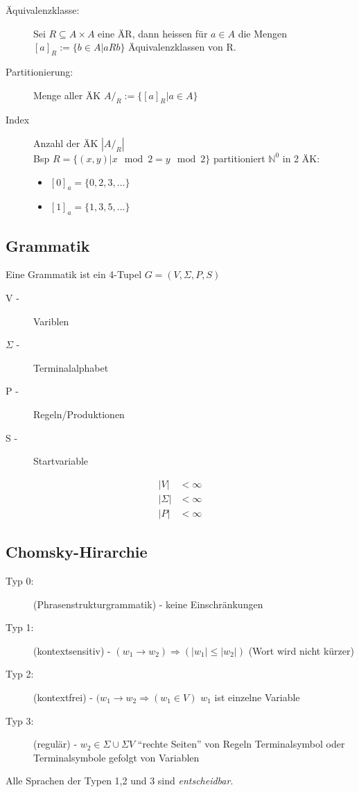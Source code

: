 \documentclass{scrartcl}
\begin{document}
\begin{description}
    \item[Äquivalenzklasse:] Sei $R \subseteq A\times A$ eine ÄR, dann heissen für $a\in A$ die Mengen $[a]_R:=\{b\in A | aRb\}$ Äquivalenzklassen von R.
    \item[Partitionierung:] Menge aller ÄK $A/_R:=\{[a]_R | a\in A\}$
    \item[Index] Anzahl der ÄK $|A/_R|$ \\
    Bsp $R=\{(x,y) | x \mod 2 = y \mod 2\}$ partitioniert $\mathds{N}^0$ in 2 ÄK:
    \begin{itemize}
        \item $[0]_a = \{0,2,3,\dots\}$
        \item $[1]_a = \{1,3,5,\dots\}$
    \end{itemize}
\end{description}

\subsection*{Grammatik}
Eine Grammatik ist ein 4-Tupel $G=(V,\Sigma,P,S)$ \\[.5cm]
\begin{minipage}[t]{4.5cm}
\begin{description}
\item[V -] Variblen
\item[$\Sigma$ -] Terminalalphabet
\item[P -] Regeln/Produktionen
\item[S -] Startvariable
\end{description}
\end{minipage}
\begin{minipage}[t]{10cm}
    \begin{align*}
        |V|         & < \infty \\
        |\Sigma|    & < \infty \\
        |P|         & < \infty
    \end{align*}
\end{minipage}

\subsection*{Chomsky-Hirarchie}
\begin{description}
\item[Typ 0:] (Phrasenstrukturgrammatik) - keine Einschränkungen
\item[Typ 1:] (kontextsensitiv) - $(w_1\to w_2) \Rightarrow (\vert w_1 \vert \leq \vert w_2 \vert)$ {\tiny (Wort wird nicht kürzer)}
\item[Typ 2:] (kontextfrei) - $(w_1\to w_2 \Rightarrow (w_1\in V)$ {\tiny $w_1$ ist einzelne Variable}
\item[Typ 3:] (regulär) - $w_2\in\Sigma\cup\Sigma V$ {\tiny "`rechte Seiten"' von Regeln Terminalsymbol oder Terminalsymbole gefolgt von Variablen}
\end{description}
Alle Sprachen der Typen 1,2 und 3 sind \emph{entscheidbar}.
\end{document}
